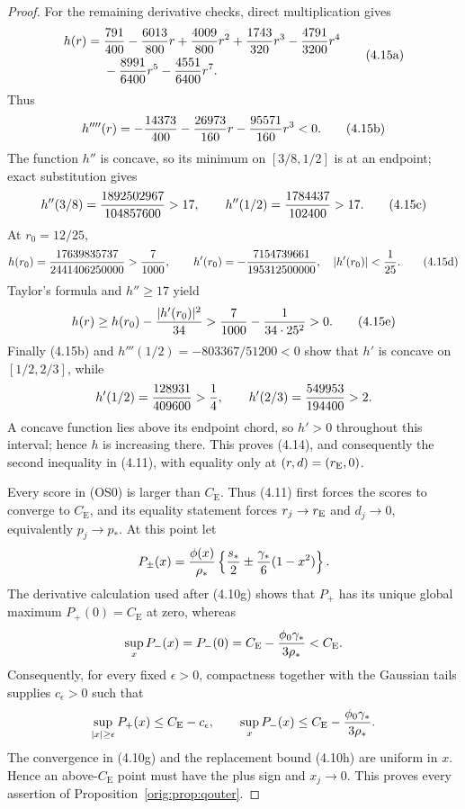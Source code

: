 \documentclass[11pt,a4paper]{article}
\numberwithin{equation}{section}
\theoremstyle{definition}
\theoremstyle{remark}
\newcommand{\CE}{C_{\mathrm E}}
\begin{document}
\begin{proof}
For the remaining derivative checks, direct multiplication gives
\[
\begin{split}
h(r)={}&{791\over400}-{6013\over800}r+{4009\over800}r^2
 +{1743\over320}r^3-{4791\over3200}r^4\\
&-{8991\over6400}r^5-{4551\over6400}r^7.
\end{split}                                           \tag{4.15a}
\]
Thus
\[
 h''''(r)=-{14373\over400}-{26973\over160}r
                  -{95571\over160}r^3<0.                \tag{4.15b}
\]
The function $h''$ is concave, so its minimum on $[3/8,1/2]$ is at an
endpoint; exact substitution gives
\[
 h''(3/8)={1892502967\over104857600}>17,\qquad
 h''(1/2)={1784437\over102400}>17.                       \tag{4.15c}
\]
At $r_0=12/25$,
\[
 h(r_0)={17639835737\over2441406250000}>{7\over1000},\qquad
 h'(r_0)=-{7154739661\over195312500000},\quad
 |h'(r_0)|<{1\over25}.                                  \tag{4.15d}
\]
Taylor's formula and $h''\ge17$ yield
\[
 h(r)\ge h(r_0)-{|h'(r_0)|^2\over34}
 >{7\over1000}-{1\over34\cdot25^2}>0.                  \tag{4.15e}
\]
Finally (4.15b) and
$h'''(1/2)=-803367/51200<0$ show that $h'$ is concave on
$[1/2,2/3]$, while
\[
 h'(1/2)={128931\over409600}>{1\over4},\qquad
 h'(2/3)={549953\over194400}>2.
\]
A concave function lies above its endpoint chord, so $h'>0$ throughout
this interval; hence $h$ is increasing there.  This
proves (4.14), and consequently the second inequality in (4.11), with
equality only at $(r,d)=(r_{\rm E},0)$.

Every score in (OS0) is larger than $\CE$.  Thus (4.11) first forces the
scores to converge to $\CE$, and its equality statement forces
$r_j\to r_{\rm E}$ and $d_j\to0$, equivalently $p_j\to p_*$.  At this
point let
\[
 P_\pm(x)={\phi(x)\over\rho_*}
 \left\{{s_*\over2}\mathbin\pm{\gamma_*\over6}(1-x^2)\right\}.
\]
The derivative calculation used after (4.10g) shows that $P_+$ has its
unique global maximum $P_+(0)=\CE$ at zero, whereas
\[
 \sup_xP_-(x)=P_-(0)=\CE-{\phi_0\gamma_*\over3\rho_*}<\CE.
\]
Consequently, for every fixed $\epsilon>0$, compactness together with the
Gaussian tails supplies $c_\epsilon>0$ such that
\[
 \sup_{|x|\ge\epsilon}P_+(x)\le\CE-c_\epsilon,
 \qquad \sup_xP_-(x)\le\CE-{\phi_0\gamma_*\over3\rho_*}.
\]
The convergence in (4.10g) and the replacement bound (4.10h) are uniform
in $x$.  Hence an above-$\CE$ point must have the plus sign and
$x_j\to0$.  This proves every assertion of
Proposition~\ref{orig:prop:qouter}.
\end{proof}
\end{document}
